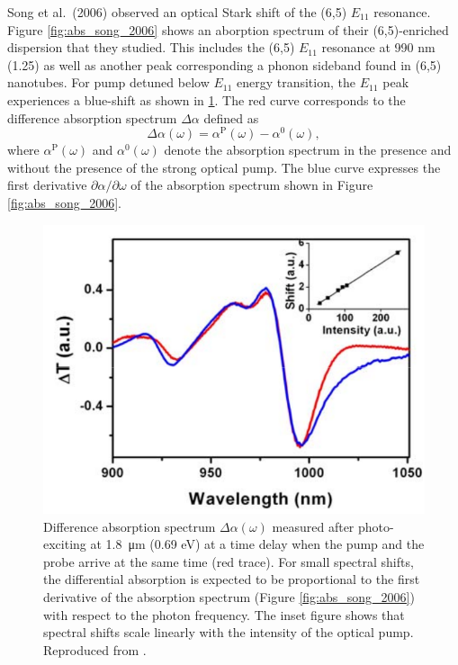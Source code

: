 Song et al.\ (2006) observed an optical Stark shift of the (6,5) $E_{11}$ resonance. Figure \ref{fig:abs_song_2006} shows an aborption spectrum of their (6,5)-enriched dispersion that they studied. This includes the (6,5) $E_{11}$ resonance at 990 nm (1.25) as well as another peak corresponding a phonon sideband found in (6,5) nanotubes. For pump detuned below $E_{11}$ energy transition, the $E_{11}$ peak experiences a blue-shift as shown in \ref{fig:dtt_song_2006}. The red curve corresponds to the difference absorption spectrum $\Delta \alpha$ defined as
\begin{equation}
	\Delta\alpha(\omega) = \alpha^\text{P}(\omega) - \alpha^0(\omega),
\end{equation}
where $\alpha^\text{P}(\omega)$ and $\alpha^\text{0}(\omega)$ denote the absorption spectrum in the presence and without the presence of the strong optical pump. The blue curve expresses  the first derivative $\partial\alpha / \partial\omega$ of the absorption spectrum shown in Figure \ref{fig:abs_song_2006}.

\begin{figure}[ht]
	\centering
	\includegraphics[scale=0.5]{images/chapter_prior_works/dtt_song_2006}
	\caption{Difference absorption spectrum $\Delta \alpha(\omega)$ measured after photo-exciting at \SI{1.8}{\um} (0.69 eV) at a time delay when the pump and the probe arrive at the same time (red trace). For small spectral shifts, the differential absorption is expected to be proportional to the first derivative of the absorption spectrum (Figure \ref{fig:abs_song_2006}) with respect to the photon frequency. The inset figure shows that spectral shifts scale linearly with the intensity of the optical pump. Reproduced from \cite{song2006optical}.}
	\label{fig:dtt_song_2006}
\end{figure}

